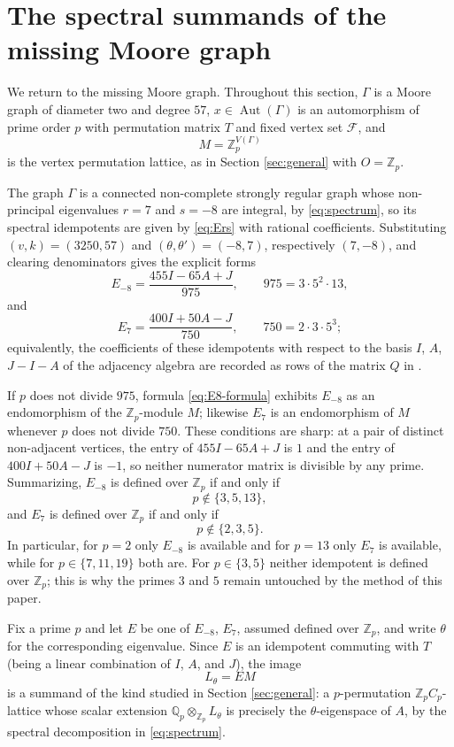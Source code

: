 \documentclass[11pt]{article}
\theoremstyle{plain}
\theoremstyle{remark}
\newcommand{\Aut}{\operatorname{Aut}}
\newcommand{\Zp}{\mathbb Z_p}
\newcommand{\Qp}{\mathbb Q_p}
\begin{document}
\section{The spectral summands of the missing Moore graph}\label{sec:spectral}

We return to the missing Moore graph.
Throughout this section, $\Gamma$ is a Moore graph of diameter two and degree $57$,
$x\in\Aut(\Gamma)$ is an automorphism of prime order $p$ with permutation matrix $T$ and fixed vertex set $\mathcal F$, and
\[
 M=\Zp^{V(\Gamma)}
\]
is the vertex permutation lattice, as in Section \ref{sec:general} with $O=\Zp$.

The graph $\Gamma$ is a connected non-complete strongly regular graph whose non-principal eigenvalues $r=7$ and $s=-8$ are integral,
by \eqref{eq:spectrum}, so its spectral idempotents are given by \eqref{eq:Ers} with rational coefficients.
Substituting $(v,k)=(3250,57)$ and $(\theta,\theta')=(-8,7)$, respectively $(7,-8)$,
and clearing denominators gives the explicit forms
\begin{equation}\label{eq:E8-formula}
 E_{-8}=\frac{455I-65A+J}{975},\qquad 975=3\cdot 5^2\cdot 13,
\end{equation}
and
\begin{equation}\label{eq:E7-formula}
 E_{7}=\frac{400I+50A-J}{750},\qquad 750=2\cdot 3\cdot 5^3;
\end{equation}
equivalently, the coefficients of these idempotents with respect to the basis $I$, $A$,
$J-I-A$ of the adjacency algebra are recorded as rows of the matrix $Q$ in \cite[Theorem 1]{MacajSiran}.

If $p$ does not divide $975$,
formula \eqref{eq:E8-formula} exhibits $E_{-8}$ as an endomorphism of the $\Zp$-module $M$;
likewise $E_7$ is an endomorphism of $M$ whenever $p$ does not divide $750$.
These conditions are sharp: at a pair of distinct non-adjacent vertices,
the entry of $455I-65A+J$ is $1$ and the entry of $400I+50A-J$ is $-1$, so neither numerator matrix is divisible by any prime.
Summarizing, $E_{-8}$ is defined over $\Zp$ if and only if
\[
 p\notin\{3,5,13\},
\]
and $E_7$ is defined over $\Zp$ if and only if
\[
 p\notin\{2,3,5\}.
\]
In particular, for $p=2$ only $E_{-8}$ is available and for $p=13$ only $E_7$ is available, while for $p\in\{7,11,19\}$ both are.
For $p\in\{3,5\}$ neither idempotent is defined over $\Zp$;
this is why the primes $3$ and $5$ remain untouched by the method of this paper.

Fix a prime $p$ and let $E$ be one of $E_{-8}$, $E_7$, assumed defined over $\Zp$,
and write $\theta$ for the corresponding eigenvalue.
Since $E$ is an idempotent commuting with $T$ (being a linear combination of $I$, $A$, and $J$), the image
\begin{equation}\label{eq:Ldef}
 L_\theta=EM
\end{equation}
is a summand of the kind studied in Section \ref{sec:general}:
a $p$-permutation $\Zp C_p$-lattice whose scalar extension $\Qp\otimes_{\Zp}L_\theta$ is precisely the $\theta$-eigenspace of $A$,
by the spectral decomposition in \eqref{eq:spectrum}.
\end{document}
